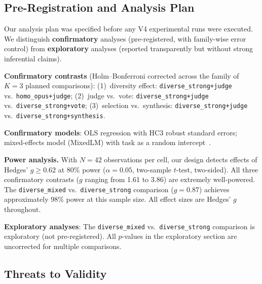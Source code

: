 \documentclass[10pt,twocolumn]{article}
\theoremstyle{remark}
\begin{document}
\subsection{Pre-Registration and Analysis Plan}
\label{sec:prereg}

Our analysis plan was specified before any V4 experimental runs were executed. We distinguish \textbf{confirmatory} analyses (pre-registered, with family-wise error control) from \textbf{exploratory} analyses (reported transparently but without strong inferential claims).

\textbf{Confirmatory contrasts} (Holm--Bonferroni corrected across the family of $K = 3$ planned comparisons): (1)~diversity effect: \texttt{diverse\_strong+judge} vs.\ \texttt{homo\_opus+judge}; (2)~judge vs.\ vote: \texttt{diverse\_strong+judge} vs.\ \texttt{diverse\_strong+vote}; (3)~selection vs.\ synthesis: \texttt{diverse\_strong+judge} vs.\ \texttt{diverse\_strong+synthesis}.

\textbf{Confirmatory models}: OLS regression with HC3 robust standard errors; mixed-effects model (MixedLM) with task as a random intercept~\cite{barr2013random}.

\textbf{Power analysis.} With $N = 42$ observations per cell, our design detects effects of Hedges' $g \geq 0.62$ at 80\% power ($\alpha = 0.05$, two-sample $t$-test, two-sided). All three confirmatory contrasts ($g$ ranging from 1.61 to 3.86) are extremely well-powered. The \texttt{diverse\_mixed} vs.\ \texttt{diverse\_strong} comparison ($g = 0.87$) achieves approximately 98\% power at this sample size. All effect sizes are Hedges' $g$ throughout.

\textbf{Exploratory analyses}: The \texttt{diverse\_mixed} vs.\ \texttt{diverse\_strong} comparison is exploratory (not pre-registered). All $p$-values in the exploratory section are uncorrected for multiple comparisons.

\subsection{Threats to Validity}
\label{sec:threats}
\end{document}
